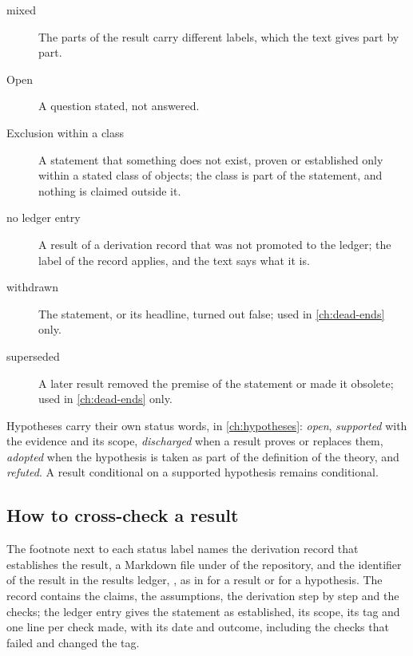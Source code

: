 \begin{description}
  \item[mixed] The parts of the result carry different labels, which the text gives part by part.

  \item[Open] A question stated, not answered.

  \item[Exclusion within a class] A statement that something does not exist, proven or established only within a stated class of objects; the class is part of the statement, and nothing is claimed outside it.

  \item[no ledger entry] A result of a derivation record that was not promoted to the ledger; the label of the record applies, and the text says what it is.

  \item[withdrawn] The statement, or its headline, turned out false; used in \cref{ch:dead-ends} only.

  \item[superseded] A later result removed the premise of the statement or made it obsolete; used in \cref{ch:dead-ends} only.
\end{description}

Hypotheses carry their own status words, in \cref{ch:hypotheses}: \emph{open}, \emph{supported} with the evidence and its scope, \emph{discharged} when a result proves or replaces them, \emph{adopted} when the hypothesis is taken as part of the definition of the theory, and \emph{refuted}.
A result conditional on a supported hypothesis remains conditional.

\subsection{How to cross-check a result}
\label{sec:pre:check}

The footnote next to each status label names the derivation record that establishes the result, a Markdown file under  of the repository, and the identifier of the result in the results ledger, , as in  for a result or  for a hypothesis.
The record contains the claims, the assumptions, the derivation step by step and the checks; the ledger entry gives the statement as established, its scope, its tag and one line per check made, with its date and outcome, including the checks that failed and changed the tag.

